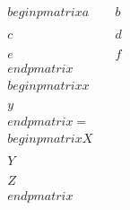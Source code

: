 \documentclass[preview]{standalone}
\begin{document}
\begin{align*}
\quad\\begin{pmatrix} a & b \quad\\\quad\\ c & d \quad\\\quad\\ e & f \quad\\end{pmatrix} \quad\\begin{pmatrix} x \quad\\\quad\\ y \quad\\end{pmatrix} = \quad\\begin{pmatrix} X \quad\\\quad\\ Y \quad\\\quad\\ Z \quad\\end{pmatrix}
\end{align*}
\end{document}
